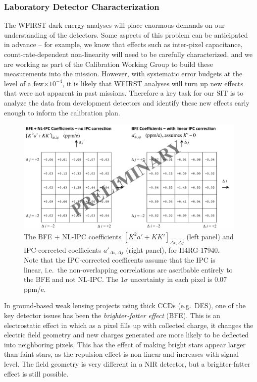 \subsubsection{Laboratory Detector Characterization}

The WFIRST dark energy analyses will place enormous demands on our understanding
of the detectors. Some aspects of this problem can be anticipated in advance --
for example, we know that effects such as inter-pixel capacitance,
count-rate-dependent non-linearity  will need to be carefully
characterized, and we are working as part of the Calibration Working Group to
build these measurements into the mission. However, with systematic error
budgets at the level of a few$\times 10^{-4}$, it is likely that WFIRST analyses
will turn up new effects that were not apparent in past missions. Therefore a
key task for our SIT is to analyze the data from development detectors and
identify these new effects early enough to inform the calibration plan.

\begin{figure}[!t]
  \includegraphics[width=6.2in]{Plots/kernel-17940B.pdf}
\caption{\label{fig:kernel}The BFE + NL-IPC coefficients $[K^2a'+KK']_{\Delta
i,\Delta j}$ (left panel) and IPC-corrected coefficients $a'_{\Delta i,\Delta
j}$ (right panel), for H4RG-17940. Note that the IPC-corrected coefficents
assume that the IPC is linear, i.e.\ the non-overlapping correlations are
ascribable entirely to the BFE and not NL-IPC. The $1\sigma$ uncertainty in each
pixel is 0.07 ppm/e.}
\end{figure}

In ground-based weak lensing projects using thick CCDs (e.g.\ DES), one of the
key detector issues has been the {\em brighter-fatter effect} (BFE). This is an
electrostatic effect in which as a pixel fills up with collected charge, it
changes the electric field geometry and new charges generated are more likely to
be deflected into neighboring pixels. This has the effect of making bright stars
appear larger than faint stars, as the repulsion effect is non-linear and
increases with signal level. The field geometry is very different in a NIR
detector, but a brighter-fatter effect is still possible.

